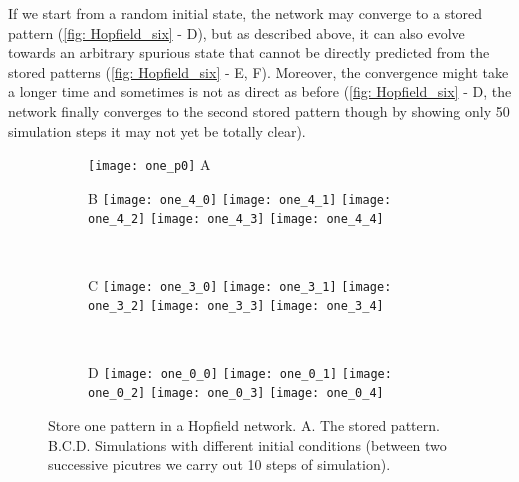 If we start from a random initial state, the network may converge to
a stored pattern (\autoref{fig: Hopfield_six} - \textsf{D}), but as
described above, it can also evolve towards an arbitrary spurious state
that cannot be directly predicted from the stored patterns
(\autoref{fig: Hopfield_six} - \textsf{E, F}). Moreover, the convergence
might take a longer time and sometimes is not as direct as before 
(\autoref{fig: Hopfield_six} - \textsf{D}, the network finally converges
to the second stored pattern though by showing only 50 simulation steps it may 
not yet be totally clear).

\newpage
\null
\vfill
\begin{figure}[H]
  \centering
  \begin{subfigure}{0.28\textwidth}
    \centering
    \texttt{[image: one\_p0]}
    \textsf{A}
  \end{subfigure}
  \hspace{0.7em}
  \begin{minipage}{0.62\textwidth}
    \begin{subfigure}{\textwidth}
      \textsf{B}
      \centering
      \texttt{[image: one\_4\_0]}
      \texttt{[image: one\_4\_1]}
      \texttt{[image: one\_4\_2]}
      \texttt{[image: one\_4\_3]}
      \texttt{[image: one\_4\_4]}
    \end{subfigure}\\[0.6em]
    \begin{subfigure}{\textwidth}
      \textsf{C}
      \centering
      \texttt{[image: one\_3\_0]}
      \texttt{[image: one\_3\_1]}
      \texttt{[image: one\_3\_2]}
      \texttt{[image: one\_3\_3]}
      \texttt{[image: one\_3\_4]}
    \end{subfigure}\\[0.6em]
    \begin{subfigure}{\textwidth}
      \textsf{D}
      \centering
      \texttt{[image: one\_0\_0]}
      \texttt{[image: one\_0\_1]}
      \texttt{[image: one\_0\_2]}
      \texttt{[image: one\_0\_3]}
      \texttt{[image: one\_0\_4]}
    \end{subfigure}
  \end{minipage}
  \vspace{1.2em}
  \caption{Store one pattern in a Hopfield network.
           \textsf{A.} The stored pattern.
           \textsf{B.C.D.} Simulations with different initial conditions
           (between two successive picutres we carry out 10 steps of
           simulation).}
  \label{fig: Hopfield_one}
\end{figure}

